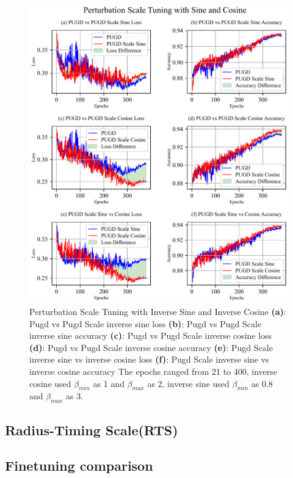 \documentclass[10pt,twocolumn,letterpaper]{article}
\begin{document}
\begin{figure}[htbp]
	\center
	\vspace{-10pt} 
	\includegraphics[width=\columnwidth]{images/PUGDScale.pdf}
	\caption{Perturbation Scale Tuning with Inverse Sine and Inverse Cosine
	\textbf{(a)}: Pugd vs Pugd Scale inverse sine loss \textbf{(b)}: Pugd vs Pugd Scale inverse sine accuracy
    \textbf{(c)}: Pugd vs Pugd Scale inverse cosine loss \textbf{(d)}: Pugd vs Pugd Scale inverse cosine accuracy
	\textbf{(e)}: Pugd Scale inverse sine vs inverse cosine loss \textbf{(f)}: Pugd Scale inverse sine vs inverse cosine accuracy
	The epochs ranged from 21 to 400, inverse cosine used $\beta_{min}$ as 1 and $\beta_{max}$ as 2, inverse sine used $\beta_{min}$ as 0.8 and $\beta_{max}$ as 3.
	}
	\label{fig:PUGDScale}
\end{figure}


\subsection{Radius-Timing Scale(RTS)}
\label{subsec:4.2}

\subsection{Finetuning comparison}
\label{subsec:4.3}
\end{document}
